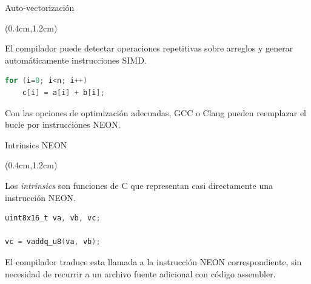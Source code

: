 
\begin{frame}[fragile]{Auto-vectorización}
 \begin{textblock*}{\textwidth}(0.4cm,1.2cm)

El compilador puede detectar operaciones repetitivas sobre arreglos y generar automáticamente instrucciones SIMD.
\vspace{0.2cm}

\begin{lstlisting}[language=C,basicstyle=\scriptsize,numbers=none, escapechar=\@]
for (i=0; i<n; i++)
    c[i] = a[i] + b[i];
\end{lstlisting}

\vspace{0.2cm}

Con las opciones de optimización adecuadas, GCC o Clang pueden reemplazar el
bucle por instrucciones NEON.
 \end{textblock*}
\end{frame}


\begin{frame}[fragile]{Intrinsics NEON}
 \begin{textblock*}{\textwidth}(0.4cm,1.2cm)
  \begin{tcolorbox}[enhanced jigsaw,rounded corners, drop fuzzy shadow=ShadowColor]
   \justifying Los \emph{intrinsics} son funciones de C que representan casi directamente una instrucción NEON.
  \end{tcolorbox}

  \vspace{0.3cm}

  \begin{lstlisting}[language=C,basicstyle=\scriptsize,numbers=none, escapechar=\@]
uint8x16_t va, vb, vc;

vc = vaddq_u8(va, vb);
  \end{lstlisting}

  \vspace{0.3cm}
  El compilador traduce esta llamada a la instrucción NEON correspondiente, sin necesidad de recurrir a un archivo fuente adicional con código assembler.
 \end{textblock*}
\end{frame}


